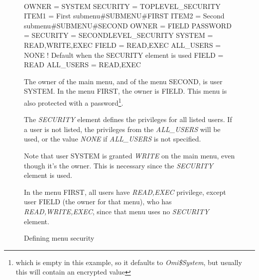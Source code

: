\documentclass[a4paper]{book}
\renewcommand{\indent}{\hspace*{5mm}}
\begin{document}
\begin{figure}[ht]
\begin{minipage}[t]{\textwidth}
\hrulefill \\
\begin{ttfamily}
 \newline
\indent OWNER = SYSTEM \newline
\indent SECURITY = TOPLEVEL{\_}SECURITY \newline
\indent ITEM1 = First submenu{\#}SUBMENU{\#}FIRST \newline
\indent ITEM2 = Second submenu{\#}SUBMENU{\#}SECOND \newline
 \newline
{} \newline
\indent OWNER = FIELD \newline
\indent PASSWORD = \newline
 \newline
{} \newline
\indent SECURITY = SECONDLEVEL{\_}SECURITY \newline
 \newline
{} \newline
\indent SYSTEM = READ,WRITE,EXEC \newline
\indent FIELD = READ,EXEC \newline
\indent ALL{\_}USERS = NONE ! Default when the SECURITY element is used \newline
 \newline
{} \newline
\indent FIELD = READ \newline
\indent ALL{\_}USERS = READ,EXEC \newline
\end{ttfamily}
\noindent The owner of the main menu, and of the menu SECOND, is user SYSTEM. In the 
menu FIRST, the owner is FIELD. This menu is also protected with a 
password\footnote{ which is empty in this example, so it defaults to 
\textsl{Omi{\$}System}, but usually this will contain an encrypted value}.

The \textsl{SECURITY} element defines the 
privileges for all listed users. If a user is not listed, the privileges 
from the \textsl{ALL{\_}USERS} will be used, or the value 
\textsl{NONE} if \textsl{ALL{\_}USERS} is not specified.

Note that user SYSTEM is granted \textsl{WRITE} on the main menu, even though it's 
the owner. This is necessary since the \textsl{SECURITY} 
element is used.

In the menu FIRST, all users have \textsl{READ,EXEC} privilege, except user FIELD (the 
owner for that menu), who has \textsl{READ,WRITE,EXEC}, since that menu uses no 
\textsl{SECURITY} element.
\caption{Defining menu security}\label{fig:secexample}
\hrulefill
\end{minipage}
\end{figure}
\end{document}
